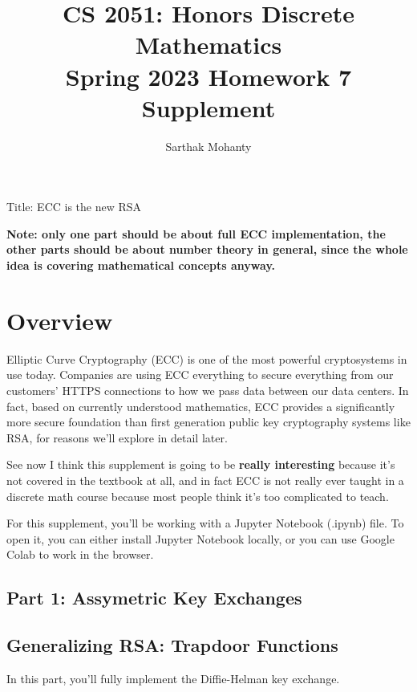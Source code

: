 \documentclass{article}
\title{\vspace{-1cm}CS 2051: Honors Discrete Mathematics \\Spring 2023 Homework 7 Supplement}
\author{Sarthak Mohanty }
\date{}
\begin{document}
\maketitle


Title: ECC is the new RSA

\textbf{Note: only one part should be about full ECC implementation, the other parts should be about number theory in general, since the whole idea is covering mathematical concepts anyway.}

\section*{Overview}

Elliptic Curve Cryptography (ECC) is one of the most powerful cryptosystems in use today. Companies are using ECC everything to secure everything from our customers' HTTPS connections to how we pass data between our data centers. In fact, based on currently understood mathematics, ECC provides a significantly more secure foundation than first generation public key cryptography systems like RSA, for reasons we'll explore in detail later.

\vspace{2mm}
See now I think this supplement is going to be \textbf{really interesting} because it's not covered in the textbook at all, and in fact ECC is not really ever taught in a discrete math course because most people think it's too complicated to teach.

\vspace{2mm}
For this supplement, you'll be working with a Jupyter Notebook (.ipynb) file. To open it, you can either install Jupyter Notebook locally, or you can use Google Colab to work in the browser.




\subsection*{Part 1: Assymetric Key Exchanges}


\subsection*{Generalizing RSA: Trapdoor Functions}

\begin{tcolorbox}
    In this part, you'll fully implement the Diffie-Helman key exchange.
    \end{tcolorbox}
\end{document}
